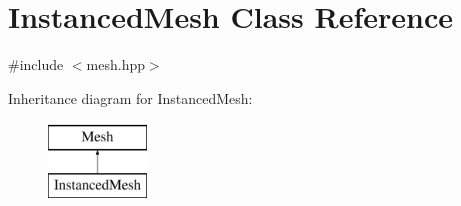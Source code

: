 \hypertarget{class_instanced_mesh}{}\section{Instanced\+Mesh Class Reference}
\label{class_instanced_mesh}


{\ttfamily \#include $<$mesh.\+hpp$>$}

Inheritance diagram for Instanced\+Mesh\+:\begin{figure}[H]
\begin{center}
\leavevmode
\includegraphics[height=2.000000cm]{class_instanced_mesh}
\end{center}
\end{figure}
